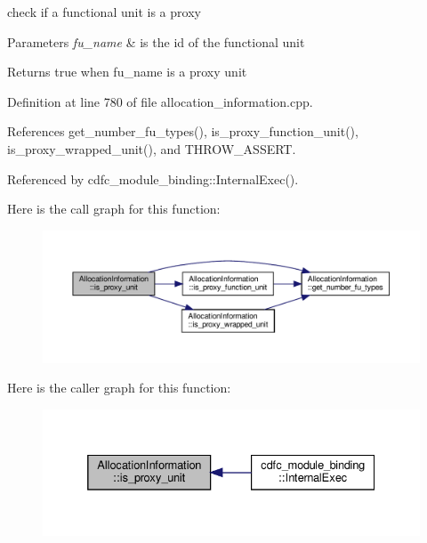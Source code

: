 check if a functional unit is a proxy 


\begin{DoxyParams}{Parameters}
{\em fu\+\_\+name} & is the id of the functional unit \\
\hline
\end{DoxyParams}
\begin{DoxyReturn}{Returns}
true when fu\+\_\+name is a proxy unit 
\end{DoxyReturn}


Definition at line 780 of file allocation\+\_\+information.\+cpp.



References get\+\_\+number\+\_\+fu\+\_\+types(), is\+\_\+proxy\+\_\+function\+\_\+unit(), is\+\_\+proxy\+\_\+wrapped\+\_\+unit(), and T\+H\+R\+O\+W\+\_\+\+A\+S\+S\+E\+RT.



Referenced by cdfc\+\_\+module\+\_\+binding\+::\+Internal\+Exec().

Here is the call graph for this function\+:
\nopagebreak
\begin{figure}[H]
\begin{center}
\leavevmode
\includegraphics[width=350pt]{d7/d79/classAllocationInformation_a62bd7f98935c32e3e634c27994382ed1_cgraph}
\end{center}
\end{figure}
Here is the caller graph for this function\+:
\nopagebreak
\begin{figure}[H]
\begin{center}
\leavevmode
\includegraphics[width=332pt]{d7/d79/classAllocationInformation_a62bd7f98935c32e3e634c27994382ed1_icgraph}
\end{center}
\end{figure}
\mbox{\label{classAllocationInformation_a64b03e943913927efd6cfb97feaf0e47}} 

